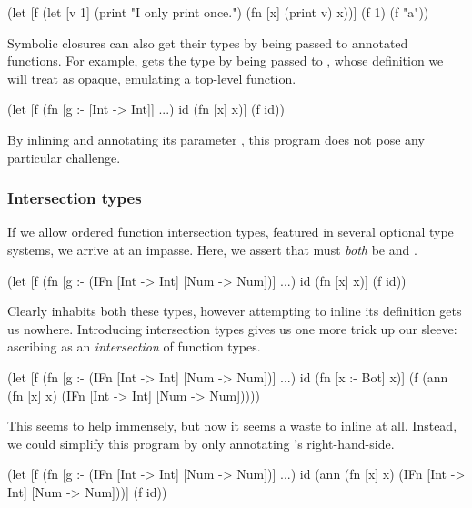 \begin{cljlisting}
(let [f (let [v 1]
          (print "I only print once.")
          (fn [x] (print v) x))]
  (f 1)
  (f "a"))
\end{cljlisting}

Symbolic closures can also get their types by being passed
to annotated functions.
For example, 
gets the type 
by being passed to , whose definition we will treat
as opaque, emulating a top-level function.

\begin{cljlisting}
(let [f (fn [g :- [Int -> Int]] ...)
      id (fn [x] x)]
  (f id))
\end{cljlisting}

By inlining  and annotating its parameter ,
this program does not pose any particular challenge.

\subsubsection{Intersection types}

If we allow ordered function intersection types,
featured in several optional type systems,
we arrive at an impasse.
Here, we assert that  must \emph{both}
be
and
.

\begin{cljlisting}
(let [f (fn [g :- (IFn [Int -> Int] [Num -> Num])] ...)
      id (fn [x] x)]
  (f id))
\end{cljlisting}

Clearly  inhabits both these types,
however attempting to inline its definition
gets us nowhere.
Introducing intersection types gives us
one more trick up our sleeve: ascribing
 as an \emph{intersection} of function types.

\begin{cljlisting}
(let [f (fn [g :- (IFn [Int -> Int] [Num -> Num])] ...)
      id (fn [x :- Bot] x)]
  (f (ann (fn [x] x)
          (IFn [Int -> Int]
               [Num -> Num]))))
\end{cljlisting}

This seems to help immensely, but now it seems a waste
to inline  at all.
Instead, we could simplify this program by only annotating 's
right-hand-side.

\begin{cljlisting}
(let [f (fn [g :- (IFn [Int -> Int] [Num -> Num])] ...)
      id (ann (fn [x] x)
              (IFn [Int -> Int]
                   [Num -> Num]))]
  (f id))
\end{cljlisting}

